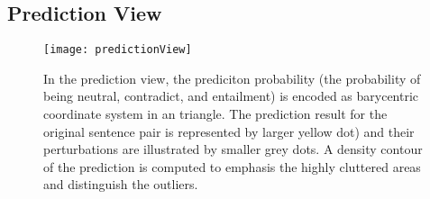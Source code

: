 \subsection{Prediction View}

\begin{figure}[htbp]
\centering
\vspace{-2mm}
 \texttt{[image: predictionView]}
 \caption{
 In the prediction view, the prediciton probability (the probability of being neutral, contradict, and entailment) is encoded as barycentric coordinate system in an triangle.
 The prediction result for the original sentence pair is represented by larger yellow dot) and their perturbations are illustrated by smaller grey dots.
 A density contour of the prediction is computed to emphasis the highly cluttered areas and distinguish the outliers.
 }
\label{fig:modelPipeline}
\end{figure}
